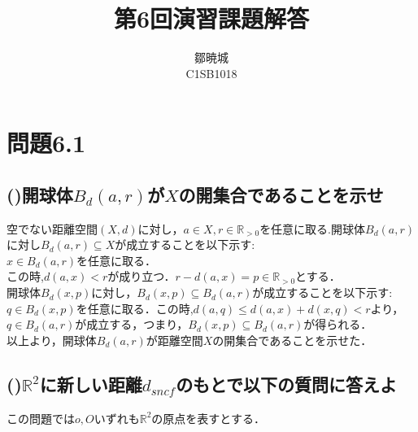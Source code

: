 \documentclass{jreport}
\newcommand{\ds}{d_{sncf}}
\newcommand{\bd}{B_d}
\newcommand{\R}{\mathbb{R}}
\newcommand{\Rp}{\mathbb{R}_{>0}}
\begin{document}
\title{第6回演習課題解答}
\author{鄒暁城\\ C1SB1018}
\maketitle
\setcounter{chapter}{6}
\newpage
\tableofcontents
{}
\newpage
\section{問題6.1}
\subsection{()開球体$\bd (a,r)$が$X$の開集合であることを示せ}
空でない距離空間$(X,d)$に対し，$a \in X,r \in \Rp $を任意に取る.開球体$\bd (a,r)$に対し$\bd (a,r) \subseteq X$が成立することを以下示す:\\
$x \in \bd(a,r) $を任意に取る．\\
この時,$d(a,x)<r$が成り立つ．$r - d(a,x) = p \in \Rp$とする．\\
開球体$\bd(x,p)$に対し，$\bd(x,p) \subseteq \bd(a,r)$が成立することを以下示す:\\
$q \in \bd(x,p)$を任意に取る．この時,$d(a,q) \le d(a,x) + d(x,q) < r$より，\\
$q \in \bd(a,r)$が成立する，つまり，$\bd(x,p) \subseteq \bd(a,r)$が得られる．\\
以上より，開球体$\bd(a,r)$が距離空間$X$の開集合であることを示せた．

\newpage

\subsection{()$\R^2$に新しい距離$\ds$のもとで以下の質問に答えよ}
この問題では$o,O$いずれも$\R^2$の原点を表すとする．
\end{document}
